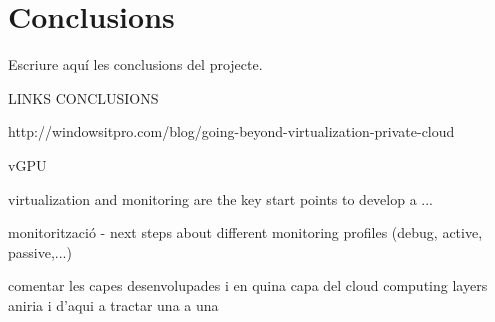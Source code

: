 \cleardoublepage
{}
\chapter*{Conclusions}\label{C:conclusions}

Escriure aquí les conclusions del projecte. 

LINKS CONCLUSIONS

http://windowsitpro.com/blog/going-beyond-virtualization-private-cloud

vGPU

virtualization and monitoring are the key start points to develop a ...

monitorització - next steps about different monitoring profiles (debug, active, passive,...)

comentar les capes desenvolupades i en quina capa del cloud computing layers aniria i d'aqui a tractar una a una